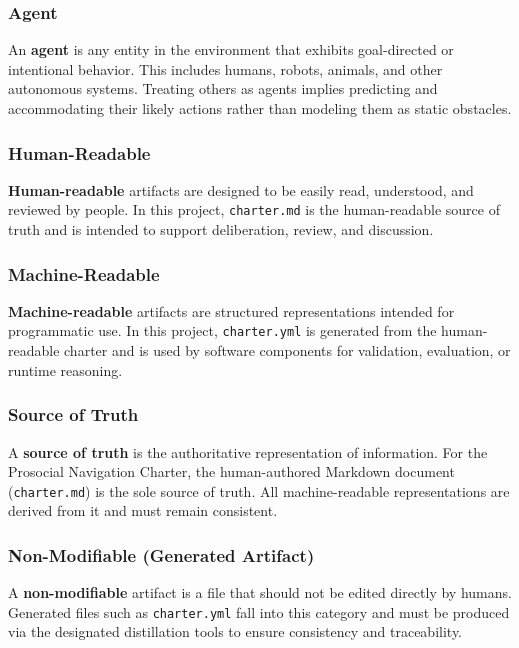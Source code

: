\documentclass[utf8]{frontiers_suppmat} %
\begin{document}
\subsubsection{Agent}\label{agent}

An \textbf{agent} is any entity in the environment that exhibits
goal-directed or intentional behavior. This includes humans, robots,
animals, and other autonomous systems. Treating others as agents implies
predicting and accommodating their likely actions rather than modeling
them as static obstacles.

\subsubsection{Human-Readable}\label{human-readable}

\textbf{Human-readable} artifacts are designed to be easily read,
understood, and reviewed by people. In this project, \texttt{charter.md}
is the human-readable source of truth and is intended to support
deliberation, review, and discussion.

\subsubsection{Machine-Readable}\label{machine-readable}

\textbf{Machine-readable} artifacts are structured representations
intended for programmatic use. In this project, \texttt{charter.yml} is
generated from the human-readable charter and is used by software
components for validation, evaluation, or runtime reasoning.

\subsubsection{Source of Truth}\label{source-of-truth}

A \textbf{source of truth} is the authoritative representation of
information. For the Prosocial Navigation Charter, the human-authored
Markdown document (\texttt{charter.md}) is the sole source of truth. All
machine-readable representations are derived from it and must remain
consistent.

\subsubsection{Non-Modifiable (Generated
Artifact)}\label{non-modifiable-generated-artifact}

A \textbf{non-modifiable} artifact is a file that should not be edited
directly by humans. Generated files such as \texttt{charter.yml} fall
into this category and must be produced via the designated distillation
tools to ensure consistency and traceability.
\end{document}
